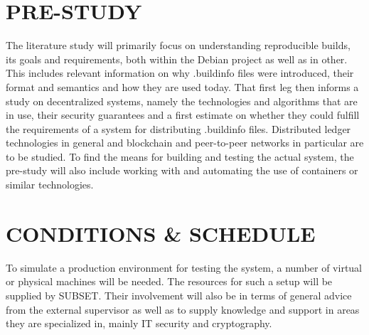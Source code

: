 \documentclass{article}
\begin{document}

\section*{PRE-STUDY}

The literature study will primarily focus on understanding reproducible builds, its goals and requirements, both within the Debian project as well as in other. This includes relevant information on why .buildinfo files were introduced, their format and semantics and how they are used today. That first leg then informs a study on decentralized systems, namely the technologies and algorithms that are in use, their security guarantees and a first estimate on whether they could fulfill the requirements of a system for distributing .buildinfo files. Distributed ledger technologies in general and blockchain and peer-to-peer networks in particular are to be studied. To find the means for building and testing the actual system, the pre-study will also include working with and automating the use of containers or similar technologies.

\section*{CONDITIONS \& SCHEDULE}

To simulate a production environment for testing the system, a number of virtual or physical machines will be needed. The resources for such a setup will be supplied by SUBSET. Their involvement will also be in terms of general advice from the external supervisor as well as to supply knowledge and support in areas they are specialized in, mainly IT security and cryptography.


\end{document}
